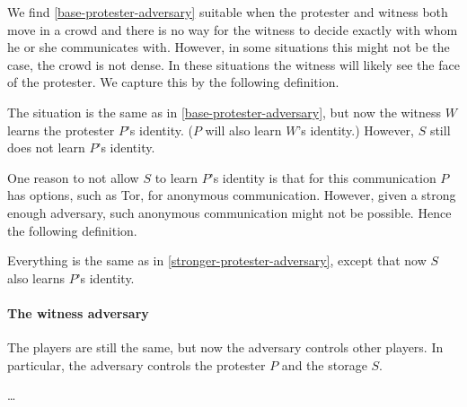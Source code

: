 We find \cref{base-protester-adversary} suitable when the protester and witness 
both move in a crowd and there is no way for the witness to decide exactly with 
whom he or she communicates with.
However, in some situations this might not be the case, \eg the crowd is not 
dense.
In these situations the witness will likely see the face of the protester.
We capture this by the following definition.

\begin{definition}%
  \label{stronger-protester-adversary}
  The situation is the same as in \cref{base-protester-adversary}, but now the 
  witness \(W\) learns the protester \(P\)'s identity.
  (\(P\) will also learn \(W\)'s identity.)
  However, \(S\) still does not learn \(P\)'s identity.
\end{definition}

One reason to not allow \(S\) to learn \(P\)'s identity is that for this 
communication \(P\) has options, such as \ac{Tor}, for anonymous communication.
However, given a strong enough adversary, such anonymous communication might 
not be possible.
Hence the following definition.

\begin{definition}%
  \label{strongest-protester-adversary}
  Everything is the same as in \cref{stronger-protester-adversary}, except that 
  now \(S\) also learns \(P\)'s identity.
\end{definition}

\paragraph{The witness adversary}

The players are still the same, but now the adversary controls other players.
In particular, the adversary controls the protester \(P\) and the storage 
\(S\).

\dots

